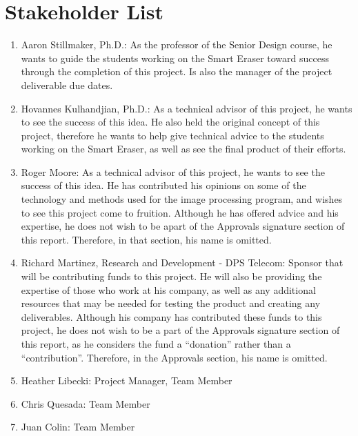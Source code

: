  \section{Stakeholder List}
 \begin{enumerate}
 	\item	Aaron Stillmaker, Ph.D.: As the professor of the Senior Design course, he wants to guide the students working on the Smart Eraser toward success through the completion of this project. Is also the manager of the project deliverable due dates.\\ 
 	\item   Hovannes Kulhandjian, Ph.D.: As a technical advisor of this project, he wants to see the success of this idea. He also held the original concept of this project, therefore he wants to help give technical advice to the students working on the Smart Eraser, as well as see the final product of their efforts.\\
 	\item   Roger Moore: As a technical advisor of this project, he wants to see the success of this idea. He has contributed his opinions on some of the technology and methods used for the image processing program, and wishes to see this project come to fruition. Although he has offered advice and his expertise, he does not wish to be apart of the Approvals signature section of this report. Therefore, in that section, his name is omitted.\\
 	\item   Richard Martinez, Research and Development - DPS Telecom: Sponsor that will be contributing funds to this project. He will also be providing the expertise of those who work at his company, as well as any additional resources that may be needed for testing the product and creating any deliverables. Although his company has contributed these funds to this project, he does not wish to be a part of the Approvals signature section of this report, as he considers the fund a ``donation'' rather than a ``contribution''. Therefore, in the Approvals section, his name is omitted.\\
 	\item	Heather Libecki: Project Manager, Team Member\\
 	\item	Chris Quesada: Team Member\\
	\item 	Juan Colin: Team Member\\
 	 	
 \end{enumerate}
 
